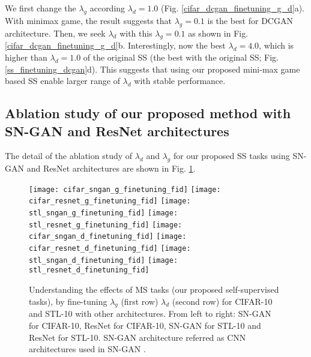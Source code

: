 \documentclass{article}
\begin{document}
We first change the $\lambda_g$ according $\lambda_d = 1.0$ (Fig. \ref{cifar_dcgan_finetuning_g_d}a). With minimax game, the result suggests that $\lambda_g = 0.1$ is the best for DCGAN architecture. Then, we seek $\lambda_d$ with this $\lambda_g = 0.1$ as shown in Fig. \ref{cifar_dcgan_finetuning_g_d}b. Interestingly, now the best $\lambda_d = 4.0$, which is higher than $\lambda_d = 1.0$ of the original SS (the best with the original SS; Fig. \ref{ss_finetuning_dcgan}d). This suggests that using our proposed mini-max game based SS enable larger range of $\lambda_d$ with stable performance. 



\subsection{Ablation study of our proposed method with SN-GAN and ResNet architectures}
\label{appendix_state_of_the_art}

The detail of the ablation study of $\lambda_d$ and $\lambda_g$ for our proposed SS tasks using SN-GAN and ResNet architectures are shown in Fig. \ref{appendix_ss_d_g_finetuning_all}.


\begin{figure}
  \centering
\texttt{[image: cifar\_sngan\_g\_finetuning\_fid]}
  \texttt{[image: cifar\_resnet\_g\_finetuning\_fid]}
  \texttt{[image: stl\_sngan\_g\_finetuning\_fid]}
  \texttt{[image: stl\_resnet\_g\_finetuning\_fid]}  
  \texttt{[image: cifar\_sngan\_d\_finetuning\_fid]}
  \texttt{[image: cifar\_resnet\_d\_finetuning\_fid]}
  \texttt{[image: stl\_sngan\_d\_finetuning\_fid]}
  \texttt{[image: stl\_resnet\_d\_finetuning\_fid]}
\caption{Understanding the effects of MS tasks (our proposed self-supervised tasks), by  fine-tuning $\lambda_g$ (first row) $\lambda_d$ (second row) for CIFAR-10 and STL-10 with other architectures. From left to right: SN-GAN for CIFAR-10, ResNet for CIFAR-10, SN-GAN for STL-10 and ResNet for STL-10. SN-GAN architecture referred as CNN architectures used in SN-GAN \cite{miyato-iclr-2018}.}
  \label{appendix_ss_d_g_finetuning_all} 
\end{figure}
\end{document}
